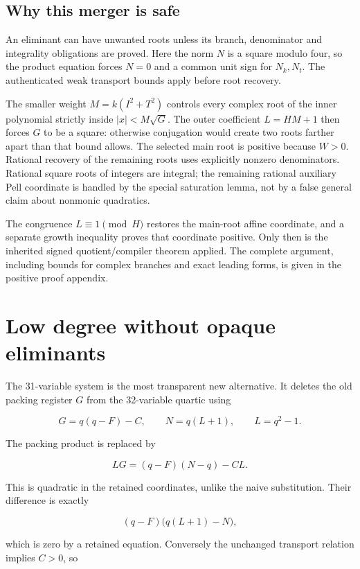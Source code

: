 \documentclass[
  10pt,
]{article}
\let\oldsection\section
\renewcommand{\section}{\clearpage\oldsection}
\begin{document}
\subsection{Why this merger is safe}\label{why-this-merger-is-safe}

An eliminant can have unwanted roots unless its branch, denominator and
integrality obligations are proved. Here the norm \(N\) is a square
modulo four, so the product equation forces \(N=0\) and a common unit
sign for \(N_k, N_t\). The authenticated weak transport bounds apply
before root recovery.

The smaller weight \(M=k(I^2+T^2)\) controls every complex root of the
inner polynomial strictly inside \(|x|<M\sqrt G\). The outer coefficient
\(L=HM+1\) then forces \(G\) to be a square: otherwise conjugation would
create two roots farther apart than that bound allows. The selected main
root is positive because \(W>0\). Rational recovery of the remaining
roots uses explicitly nonzero denominators. Rational square roots of
integers are integral; the remaining rational auxiliary Pell coordinate
is handled by the special saturation lemma, not by a false general claim
about nonmonic quadratics.

The congruence \(L\equiv1\pmod H\) restores the main-root affine
coordinate, and a separate growth inequality proves that coordinate
positive. Only then is the inherited signed quotient/compiler theorem
applied. The complete argument, including bounds for complex branches
and exact leading forms, is given in the positive proof appendix.

\section{Low degree without opaque
eliminants}\label{low-degree-without-opaque-eliminants}

The 31-variable system is the most transparent new alternative. It
deletes the old packing register \(G\) from the 32-variable quartic
using

\[G=q(q-F)-C,\qquad N=q(L+1),\qquad L=q^2-1.\]

The packing product is replaced by

\[LG=(q-F)(N-q)-CL.\]

This is quadratic in the retained coordinates, unlike the naive
substitution. Their difference is exactly

\[(q-F)\bigl(q(L+1)-N\bigr),\]

which is zero by a retained equation. Conversely the unchanged transport
relation implies \(C>0\), so
\end{document}
